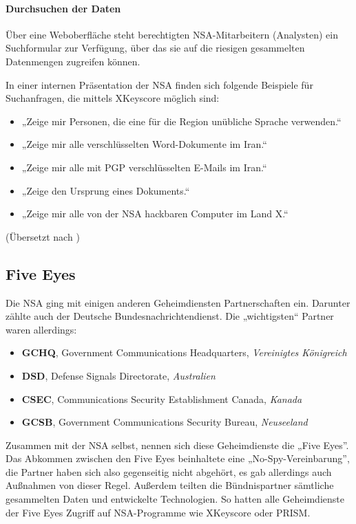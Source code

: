 \documentclass[12pt,a4paper]{scrartcl}
\begin{document}
\paragraph{Durchsuchen der Daten}
Über eine Weboberfläche steht berechtigten NSA-Mitarbeitern (Analysten) ein Suchformular zur Verfügung, über das sie auf die riesigen gesammelten Datenmengen zugreifen können.

In einer internen Präsentation der NSA finden sich folgende Beispiele für Suchanfragen, die mittels XKeyscore möglich sind:

\begin{itemize}
\item „Zeige mir Personen, die eine für die Region unübliche Sprache verwenden.“
\item „Zeige mir alle verschlüsselten Word-Dokumente im Iran.“
\item „Zeige mir alle mit PGP verschlüsselten E-Mails im Iran.“
\item „Zeige den Ursprung eines Dokuments.“
\item „Zeige mir alle von der NSA hackbaren Computer im Land X.“
\end{itemize}
(Übersetzt nach \cite{nsa_xkeyscore})

\subsection{Five Eyes}
Die NSA ging mit einigen anderen Geheimdiensten Partnerschaften ein. Darunter zählte auch der Deutsche Bundesnachrichtendienst.\cite{zeit_partner} Die „wichtigsten“ Partner waren allerdings:
\begin{itemize}
\item \textbf{GCHQ}, Government Communications Headquarters, \emph{Vereinigtes Königreich}
\item \textbf{DSD}, Defense Signals Directorate, \emph{Australien}
\item \textbf{CSEC}, Communications Security Establishment Canada, \emph{Kanada}
\item \textbf{GCSB}, Government Communications Security Bureau, \emph{Neuseeland}
\end{itemize}\cite{wiki_ukusa}

Zusammen mit der NSA selbst, nennen sich diese Geheimdienste die „Five Eyes”.\cite{wiki_ukusa}
Das Abkommen zwischen den Five Eyes beinhaltete eine „No-Spy-Vereinbarung”, die Partner haben sich also gegenseitig nicht abgehört, es gab allerdings auch Außnahmen von dieser Regel. Außerdem teilten die Bündnispartner sämtliche gesammelten Daten und entwickelte Technologien.\cite{wiki_ukusa} So hatten alle Geheimdienste der Five Eyes Zugriff auf NSA-Programme wie XKeyscore oder PRISM.\cite{wiki_ukusa}
\end{document}
